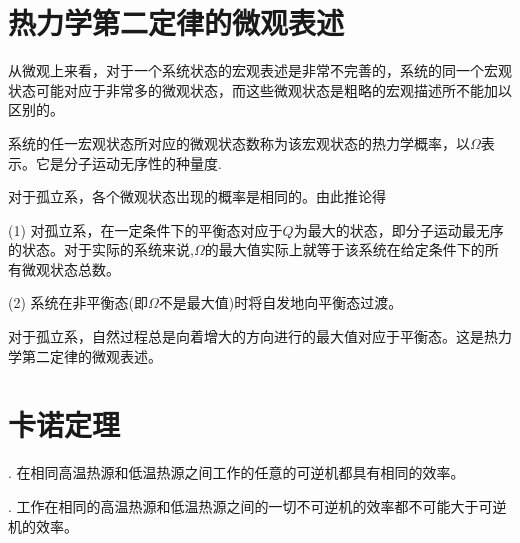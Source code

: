 \section{热力学第二定律的微观表述}
 从微观上来看，对于一个系统状态的宏观表述是非常不完善的，系统的同一个宏观状态可能对应于非常多的微观状态，而这些微观状态是粗略的宏观描述所不能加以区别的。\jg
\par {} 系统的任一宏观状态所对应的微观状态数称为该宏观状态的热力学概率，以$\Omega$表示。它是分子运动无序性的种量度.\jg
\par \dya[基本统计假设] 对于孤立系，各个微观状态岀现的概率是相同的。由此推论得\jg
\par \quad (1) 对孤立系，在一定条件下的平衡态对应于$Q$为最大的状态，即分子运动最无序的状态。对于实际的系统来说,$\Omega $的最大值实际上就等于该系统在给定条件下的所有微观状态总数。
\par \quad (2) 系统在非平衡态(即$\Omega$不是最大值)时将自发地向平衡态过渡。
\par \quad \quad 对于孤立系，自然过程总是向着增大的方向进行的最大值对应于平衡态。这是热力学第二定律的微观表述。

\section{卡诺定理}
\margin{\\\quad}
\par {}\jg
\par \quad {}. 在相同高温热源和低温热源之间工作的任意的可逆机都具有相同的效率。
\par \quad {}. 工作在相同的高温热源和低温热源之间的一切不可逆机的效率都不可能大于可逆机的效率。


